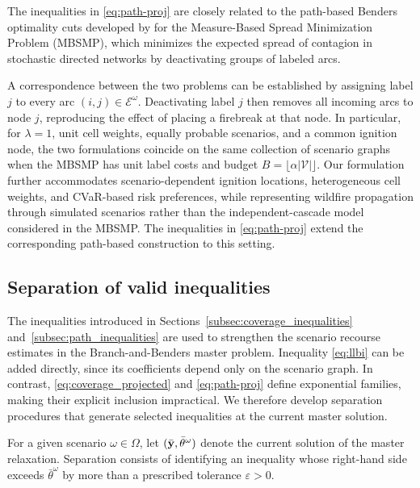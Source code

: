\documentclass{itor}
\begin{document}
The inequalities in \eqref{eq:path-proj} are closely related to the
path-based Benders optimality cuts developed by
\citet{taninmics2024benders} for the Measure-Based Spread Minimization
Problem (MBSMP), which minimizes the expected spread of contagion
in stochastic directed networks by deactivating groups of labeled arcs.

A correspondence between the two problems can be established by
assigning label $j$ to every arc $(i,j)\in\mathcal{E}^{\omega}$.
Deactivating label $j$ then removes all incoming arcs to node $j$,
reproducing the effect of placing a firebreak at that node.
In particular, for $\lambda=1$, unit cell weights, equally
probable scenarios, and a common ignition node, the two formulations
coincide on the same collection of scenario graphs when the MBSMP
has unit label costs and budget
$B=\lfloor\alpha|\mathcal{V}|\rfloor$. Our formulation further accommodates scenario-dependent ignition
locations, heterogeneous cell weights, and CVaR-based risk preferences,
while representing wildfire propagation through simulated scenarios
rather than the independent-cascade model considered in the MBSMP.
The inequalities in \eqref{eq:path-proj} extend the corresponding
path-based construction to this setting.


\subsection{Separation of valid inequalities}
\label{subsec:separation}

The inequalities introduced in Sections~\ref{subsec:coverage_inequalities}
and~\ref{subsec:path_inequalities} are used to strengthen the scenario recourse estimates in the Branch-and-Benders master problem. Inequality \eqref{eq:llbi} can be added directly, since its coefficients depend only on the scenario graph. In contrast, \eqref{eq:coverage_projected} and \eqref{eq:path-proj} define exponential families, making their explicit inclusion impractical. We therefore develop separation procedures that generate selected inequalities at the current master solution.

For a given scenario $\omega\in\Omega$, let
$(\bar{\vb{y}},\bar\theta^\omega)$ denote the current solution of the master relaxation. Separation consists of identifying an inequality whose right-hand side exceeds $\bar\theta^\omega$ by more than a prescribed tolerance $\varepsilon>0$.
\end{document}

